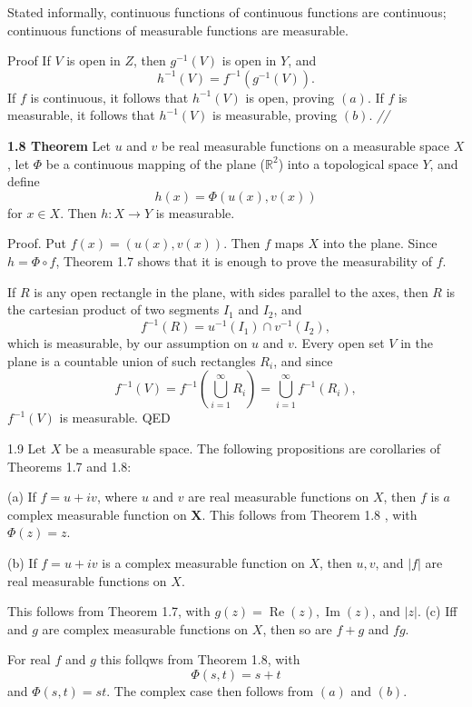 \documentclass[11pt]{article}
\begin{document}
Stated informally, continuous functions of continuous functions are continuous; continuous functions of measurable functions are measurable.

Proof If \(V\) is open in \(Z\), then \(g^{-1}(V)\) is open in \(Y\), and
\[h^{-1}(V)=f^{-1}\left(g^{-1}(V)\right) .\]
If \(f\) is continuous, it follows that \(h^{-1}(V)\) is open, proving \((a)\).
If \(f\) is measurable, it follows that \(h^{-1}(V)\) is measurable, proving \((b)\). \emph{//}

\medskip
\label{orgac20489}
\textbf{\textbf{1.8 Theorem}} Let \(u\) and \(v\) be real measurable functions on a measurable space \(X\), let \(\Phi\) be a continuous mapping of the plane (\(\mathbb R^{2}\)) into a topological space \(Y\), and define
\[
h(x)=\Phi(u(x), v(x))
\]
for \(x \in X\). Then \(h: X \rightarrow Y\) is measurable.

Proof. Put \(f(x)=(u(x), v(x))\). Then \(f\) maps \(X\) into the plane. Since \(h=\Phi \circ f\), Theorem 1.7 shows that it is enough to prove the measurability of \(f\).

If \(R\) is any open rectangle in the plane, with sides parallel to the axes, then \(R\) is the cartesian product of two segments \(I_1\) and \(I_2\), and
\[
f^{-1}(R)=u^{-1}\left(I_1\right) \cap v^{-1}\left(I_2\right),
\]
which is measurable, by our assumption on \(u\) and \(v\). Every open set \(V\) in the plane is a countable union of such rectangles \(R_i\), and since
\[
f^{-1}(V)=f^{-1}\left(\bigcup_{i=1}^{\infty} R_i\right)=\bigcup_{i=1}^{\infty} f^{-1}\left(R_i\right),
\]
\(f^{-1}(V)\) is measurable. QED

\medskip
\label{org383b408}
1.9 Let \(X\) be a measurable space. The following propositions are corollaries of Theorems 1.7 and 1.8:

(a) If \(f=u+i v\), where \(u\) and \(v\) are real measurable functions on \(X\), then \(f\) is \(a\) complex measurable function on \(\boldsymbol{X}\).
This follows from Theorem 1.8 , with \(\Phi(z)=z\).

(b) If \(f=u+i v\) is a complex measurable function on \(X\), then \(u, v\), and \(|f|\) are real measurable functions on \(X\).

This follows from Theorem 1.7, with \(g(z)=\operatorname{Re}(z), \operatorname{Im}(z)\), and \(|z|\).
(c) Iff and \(g\) are complex measurable functions on \(X\), then so are \(f+g\) and \(f g\).

For real \(f\) and \(g\) this follqws from Theorem 1.8, with
\[
\Phi(s, t)=s+t
\]
and \(\Phi(s, t)=s t\). The complex case then follows from \((a)\) and \((b)\).
\end{document}
